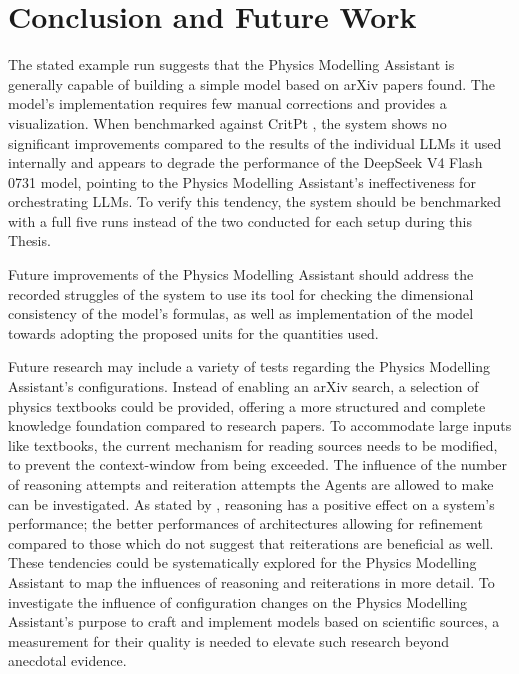 \documentclass[
	fontsize = 11pt,
	paper = a4,
	draft = false,
	twoside = true,
	titlepage = false
]{scrartcl}
\numberwithin{equation}{subsection}
\begin{document}
	\FloatBarrier
	\pagebreak
	\section{Conclusion and Future Work}
	The stated example run suggests that the Physics Modelling Assistant is generally capable of building a simple model based on arXiv \autocite{arxiv} papers found. The model's implementation requires few manual corrections and provides a visualization. When benchmarked against CritPt \autocite{critPtArx}, the system shows no significant improvements compared to the results of the individual \gls{LLM}s it used internally and appears to degrade the performance of the DeepSeek V4 Flash 0731 model, pointing to the Physics Modelling Assistant's ineffectiveness for orchestrating \gls{LLM}s. To verify this tendency, the system should be benchmarked with a full five runs instead of the two conducted for each setup during this Thesis.
	
	Future improvements of the Physics Modelling Assistant should address the recorded struggles of the system to use its tool for checking the dimensional consistency of the model's formulas, as well as implementation of the model towards adopting the proposed units for the quantities used.
	
	Future research may include a variety of tests regarding the Physics Modelling Assistant's configurations. Instead of enabling an arXiv search, a selection of physics textbooks could be provided, offering a more structured and complete knowledge foundation compared to research papers. To accommodate large inputs like textbooks, the current mechanism for reading sources needs to be modified, to prevent the \gls{context-window} from being exceeded.	The influence of the number of reasoning attempts and reiteration attempts the \glspl{Agent} are allowed to make can be investigated. As stated by \citeauthor{reasoningGood} \autocite{reasoningGood}, reasoning has a positive effect on a system's performance; the better performances of architectures allowing for refinement compared to those which do not \autocite{orchStyles} suggest that reiterations are beneficial as well. These tendencies could be systematically explored for the Physics Modelling Assistant to map the influences of reasoning and reiterations in more detail.	To investigate the influence of configuration changes on the Physics Modelling Assistant's purpose to craft and implement models based on scientific sources, a measurement for their quality is needed to elevate such research beyond anecdotal evidence.
	
\end{document}
